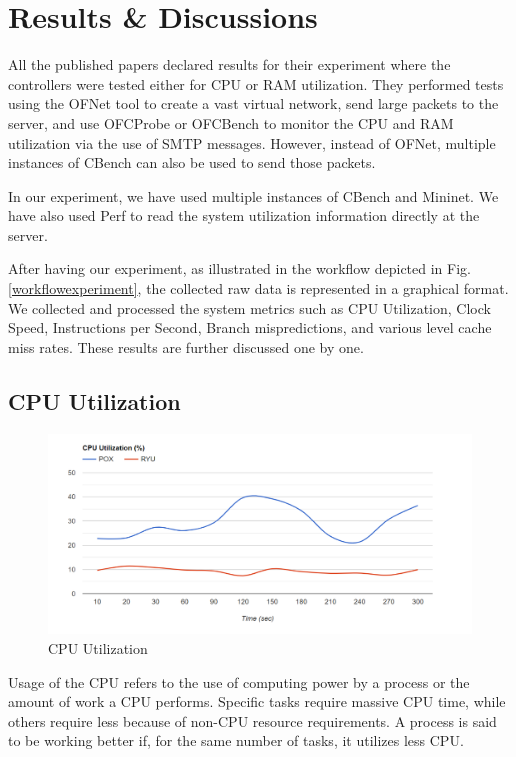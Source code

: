 \chapter{Results \& Discussions}

All the published papers declared results for their experiment where the controllers were tested either for CPU or RAM utilization. They performed tests using the OFNet tool to create a vast virtual network, send large packets to the server, and use OFCProbe or OFCBench to monitor the CPU and RAM utilization via the use of SMTP messages. However, instead of OFNet, multiple instances of CBench can also be used to send those packets.

In our experiment, we have used multiple instances of CBench and Mininet. We have also used Perf to read the system utilization information directly at the server.

After having our experiment, as illustrated in the workflow depicted in Fig. \ref{workflowexperiment}, the collected raw data is represented in a graphical format. We collected and processed the system metrics such as CPU Utilization, Clock Speed, Instructions per Second, Branch mispredictions, and various level cache miss rates. These results are further discussed one by one.

\section{CPU Utilization}

\begin{figure}[!hbt]
    \centering
        \includegraphics[width=\textwidth,keepaspectratio]{images/cpu_utilization.png}
       \caption{CPU Utilization}
        \label{CPUutilization}
\end{figure}

Usage of the CPU refers to the use of computing power by a process or the amount of work a CPU performs. Specific tasks require massive CPU time, while others require less because of non-CPU resource requirements. A process is said to be working better if, for the same number of tasks, it utilizes less CPU.


